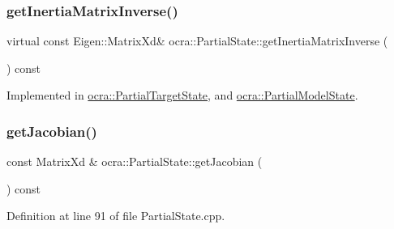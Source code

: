 \hypertarget{classocra_1_1PartialState_a83979e39dd3631861c724514e49cb8b4}{}\label{classocra_1_1PartialState_a83979e39dd3631861c724514e49cb8b4} 
\subsubsection{\texorpdfstring{get\+Inertia\+Matrix\+Inverse()}{getInertiaMatrixInverse()}}
{\footnotesize\ttfamily virtual const Eigen\+::\+Matrix\+Xd\& ocra\+::\+Partial\+State\+::get\+Inertia\+Matrix\+Inverse (\begin{DoxyParamCaption}{ }\end{DoxyParamCaption}) const\hspace{0.3cm}{\ttfamily [pure virtual]}}



Implemented in \hyperlink{classocra_1_1PartialTargetState_a0e6f90f112e0a54384eb99dd7def49e0}{ocra\+::\+Partial\+Target\+State}, and \hyperlink{classocra_1_1PartialModelState_a664e4f70861eefde844dca6dd09a2213}{ocra\+::\+Partial\+Model\+State}.

\hypertarget{classocra_1_1PartialState_a563b7fb82df68c847120211884019e17}{}\label{classocra_1_1PartialState_a563b7fb82df68c847120211884019e17} 
\subsubsection{\texorpdfstring{get\+Jacobian()}{getJacobian()}}
{\footnotesize\ttfamily const Matrix\+Xd \& ocra\+::\+Partial\+State\+::get\+Jacobian (\begin{DoxyParamCaption}{ }\end{DoxyParamCaption}) const}



Definition at line 91 of file Partial\+State.\+cpp.

\hypertarget{classocra_1_1PartialState_a2de65bbf0d2bb85a98d444c3f3bf0b06}{}\label{classocra_1_1PartialState_a2de65bbf0d2bb85a98d444c3f3bf0b06} 
